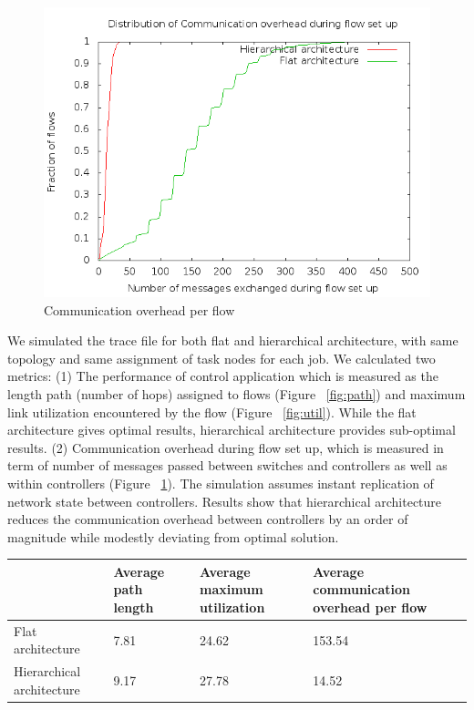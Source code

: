 \documentclass[10pt, twocolumn]{article}
\begin{document}
\begin{figure}
\label{fig:msg}
\includegraphics[scale=0.3]{msg}
\caption{Communication overhead per flow}
\end{figure}

We simulated the trace file for both flat and hierarchical architecture, with same topology and same assignment of task nodes for each job. We calculated two metrics: (1) The performance of control application which is measured as the length path (number of hops) assigned to flows (Figure ~\ref{fig:path}) and maximum link utilization encountered by the flow (Figure ~\ref{fig:util}). While the flat architecture gives optimal results, hierarchical architecture provides sub-optimal results. (2) Communication overhead during flow set up, which is measured in term of number of messages passed between switches and controllers as well as within controllers (Figure ~\ref{fig:msg}). The simulation assumes instant replication of network state between controllers. Results show that hierarchical architecture reduces the communication overhead between controllers by an order of magnitude while modestly deviating from optimal solution.

\begin{table}
\centering
\begin{tabular}{| L{5cm} | L{3cm} | L{3cm} | L{5cm} |}
\hline
& {Average path length} & {Average maximum utilization} & {Average communication overhead per flow} \\ \hline
Flat architecture & 7.81 & 24.62 & 153.54 \\ \hline
Hierarchical architecture & 9.17 & 27.78 & 14.52 \\ \hline
\end{tabular}
\end{table}%
\end{document}
